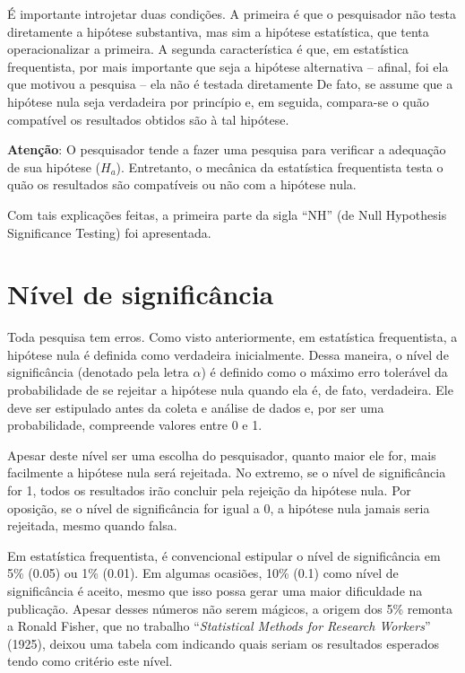 \documentclass[
]{book}
\begin{document}
É importante introjetar duas condições. A primeira é que o pesquisador não testa diretamente a hipótese substantiva, mas sim a hipótese estatística, que tenta operacionalizar a primeira. A segunda característica é que, em estatística frequentista, por mais importante que seja a hipótese alternativa -- afinal, foi ela que motivou a pesquisa -- ela não é testada diretamente De fato, se assume que a hipótese nula seja verdadeira por princípio e, em seguida, compara-se o quão compatível os resultados obtidos são à tal hipótese.

\begin{warning}

\textbf{Atenção}: O pesquisador tende a fazer uma pesquisa para verificar a adequação de sua hipótese (\(H_a\)). Entretanto, o mecânica da estatística frequentista testa o quão os resultados são compatíveis ou não com a hipótese nula.

\end{warning}

Com tais explicações feitas, a primeira parte da sigla ``NH'' (de Null Hypothesis Significance Testing) foi apresentada.

\hypertarget{nuxedvel-de-significuxe2ncia}{%
\section{Nível de significância}\label{nuxedvel-de-significuxe2ncia}}

Toda pesquisa tem erros. Como visto anteriormente, em estatística frequentista, a hipótese nula é definida como verdadeira inicialmente. Dessa maneira, o nível de significância (denotado pela letra \(\alpha\)) é definido como o máximo erro tolerável \citep{Greenland2019} da probabilidade de se rejeitar a hipótese nula quando ela é, de fato, verdadeira. Ele deve ser estipulado antes da coleta e análise de dados e, por ser uma probabilidade, compreende valores entre 0 e 1.

Apesar deste nível ser uma escolha do pesquisador, quanto maior ele for, mais facilmente a hipótese nula será rejeitada. No extremo, se o nível de significância for 1, todos os resultados irão concluir pela rejeição da hipótese nula. Por oposição, se o nível de significância for igual a 0, a hipótese nula jamais seria rejeitada, mesmo quando falsa.

Em estatística frequentista, é convencional estipular o nível de significância em 5\% (0.05) ou 1\% (0.01). Em algumas ocasiões, 10\% (0.1) como nível de significância é aceito, mesmo que isso possa gerar uma maior dificuldade na publicação. Apesar desses números não serem mágicos, a origem dos 5\% remonta a Ronald Fisher, que no trabalho ``\emph{Statistical Methods for Research Workers}'' (1925), deixou uma tabela com indicando quais seriam os resultados esperados tendo como critério este nível.
\end{document}
